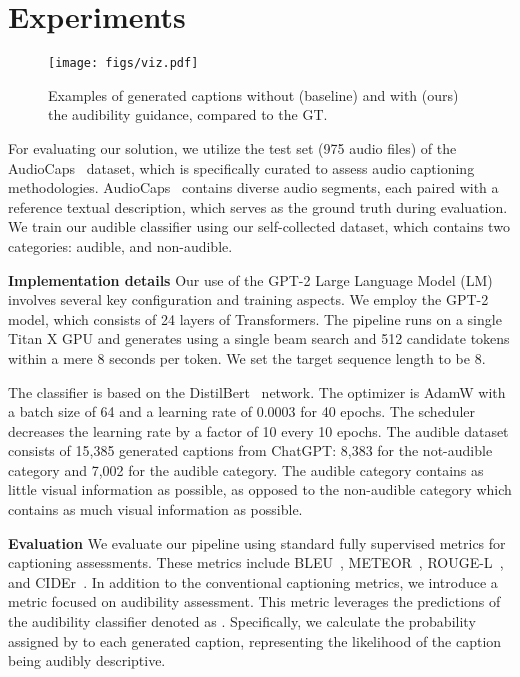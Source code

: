 \documentclass{article}
\begin{document}
\section{Experiments}

\begin{figure}[t]
    \centering
    \texttt{[image: figs/viz.pdf]}
    \vspace{-7mm}
    \caption{Examples of generated captions without (baseline) and with (ours) the audibility guidance, compared to the GT.}
    \label{fig:viz}
    \vspace{-5mm}
\end{figure}


For evaluating our solution, we utilize the test set (975 audio files) of the AudioCaps~\cite{kim2019audiocaps} dataset, which is specifically curated to assess audio captioning methodologies. AudioCaps~\cite{kim2019audiocaps} contains diverse audio segments, each paired with a reference textual description, which serves as the ground truth during evaluation. We train our audible classifier using our self-collected dataset, which contains two categories: audible, and non-audible.


\noindent\textbf{Implementation details\quad}
Our use of the GPT-2 Large Language Model (LM) involves several key configuration and training aspects. We employ the GPT-2 model, which consists of 24 layers of Transformers. 
The pipeline runs on a single Titan X GPU and generates using a single beam search and 512 candidate tokens within a mere 8 seconds per token. We set the target sequence length to be 8.


The classifier  is based on the DistilBert~\cite{sanh2019distilbert} network. The optimizer is AdamW with a batch size of 64 and a learning rate of 0.0003 for 40 epochs. The scheduler decreases the learning rate by a factor of 10 every 10 epochs. The audible dataset consists of 15,385 generated captions from ChatGPT: 8,383 for the not-audible category and 7,002 for the audible category. The audible category contains as little visual information as possible, as opposed to the non-audible category which contains as much visual information as possible.


\noindent\textbf{Evaluation} We evaluate our pipeline using standard fully supervised metrics for captioning assessments. These metrics include BLEU~\cite{papineni2002bleu}, METEOR~\cite{banerjee2005meteor}, ROUGE-L~\cite{lin2004rouge}, and CIDEr~\cite{vedantam2015cider}.
In addition to the conventional captioning metrics, we introduce a metric focused on audibility assessment. This metric leverages the predictions of the audibility classifier denoted as . Specifically, we calculate the probability assigned by  to each generated caption, representing the likelihood of the caption being audibly descriptive.
\end{document}
